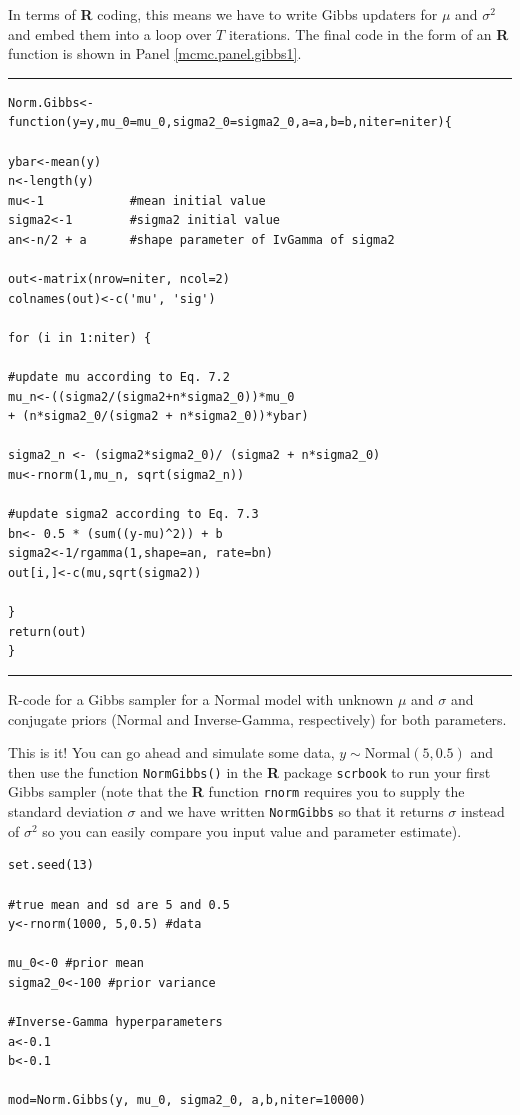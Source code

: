 In terms of {\bf R} coding, this means we have to write Gibbs updaters for
$\mu$ and $\sigma^2$ and embed them into a loop over $T$ iterations. The final
code in the form of an {\bf R} function is shown
in Panel \ref{mcmc.panel.gibbs1}.
\begin{panel}[ht]
\centering
\rule[0.15in]{\textwidth}{.03in}
{\small
\begin{verbatim}
Norm.Gibbs<-function(y=y,mu_0=mu_0,sigma2_0=sigma2_0,a=a,b=b,niter=niter){

ybar<-mean(y)
n<-length(y)
mu<-1            #mean initial value
sigma2<-1        #sigma2 initial value
an<-n/2 + a      #shape parameter of IvGamma of sigma2

out<-matrix(nrow=niter, ncol=2)
colnames(out)<-c('mu', 'sig')

for (i in 1:niter) {

#update mu according to Eq. 7.2
mu_n<-((sigma2/(sigma2+n*sigma2_0))*mu_0
+ (n*sigma2_0/(sigma2 + n*sigma2_0))*ybar)

sigma2_n <- (sigma2*sigma2_0)/ (sigma2 + n*sigma2_0)
mu<-rnorm(1,mu_n, sqrt(sigma2_n))

#update sigma2 according to Eq. 7.3
bn<- 0.5 * (sum((y-mu)^2)) + b
sigma2<-1/rgamma(1,shape=an, rate=bn)
out[i,]<-c(mu,sqrt(sigma2))

}
return(out)
}
\end{verbatim}
}
\rule[-0.15in]{\textwidth}{.03in}
\caption{
R-code for a Gibbs sampler for a Normal model with unknown $\mu$
and $\sigma$ and conjugate priors (Normal and Inverse-Gamma, respectively)
for both parameters.
}
\label{mcmc.panel.gibbs1}
\end{panel}

This is it! You can go ahead and simulate some data, $y \sim \mbox{Normal}(5, 0.5)$ and then use the function \mbox{\tt NormGibbs()} in the {\bf R} package \mbox{\tt scrbook} to run your first Gibbs sampler (note that the {\bf R} function {\tt rnorm} requires you to supply the standard deviation $\sigma$ and we have written {\tt NormGibbs} so that it returns $\sigma$ instead of $\sigma^2$ so you can easily compare you input value and parameter estimate).

\begin{verbatim}
set.seed(13)

#true mean and sd are 5 and 0.5
y<-rnorm(1000, 5,0.5) #data

mu_0<-0 #prior mean
sigma2_0<-100 #prior variance

#Inverse-Gamma hyperparameters
a<-0.1
b<-0.1

mod=Norm.Gibbs(y, mu_0, sigma2_0, a,b,niter=10000)
\end{verbatim}

